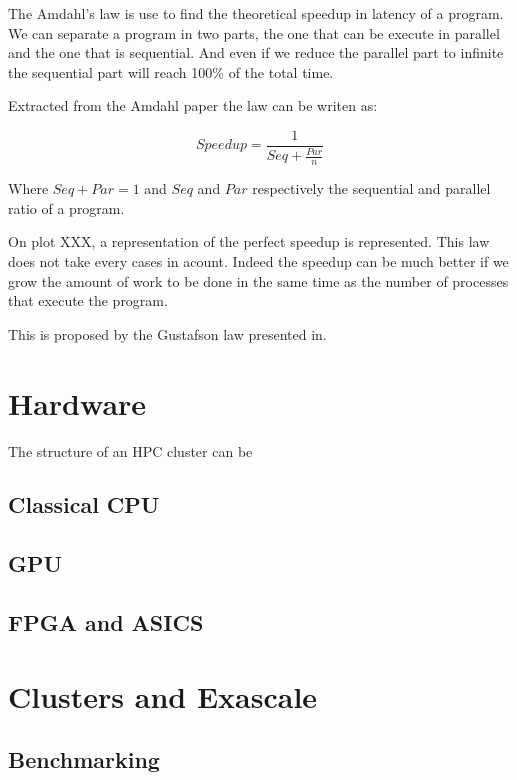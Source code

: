 The Amdahl's\cite{amdahl1967validity} law is use to find the theoretical speedup in latency of a program.
We can separate a program in two parts, the one that can be execute in parallel and the one that is sequential. 
And even if we reduce the parallel part to infinite the sequential part will reach 100\% of the total time. 

Extracted from the Amdahl paper the law can be writen as: 

\begin{equation}
Speedup = \frac{1}{Seq + \frac{Par}{n}}
\end{equation}

Where $Seq + Par = 1$ and $Seq$ and $Par$ respectively the sequential and parallel ratio of a program. 

On plot XXX, a representation of the perfect speedup is represented.
This law does not take every cases in acount. 
Indeed the speedup can be much better if we grow the amount of work to be done in the same time as the number of processes that execute the program. 

This is proposed by the Gustafson law presented in. 

\section{Hardware}

The structure of an HPC cluster can be 

\subsection{Classical CPU}

\subsection{GPU}

\subsection{FPGA and ASICS}

\section{Clusters and Exascale}

\subsection{Benchmarking}

